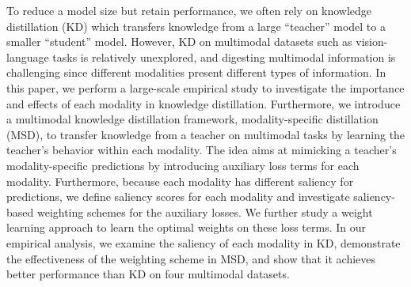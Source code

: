 To reduce a model size but retain performance, we often rely on knowledge distillation (KD) which transfers knowledge from a large ``teacher'' model to a smaller ``student'' model. However, KD on multimodal datasets such as vision-language tasks is relatively unexplored, and digesting multimodal information is challenging since different modalities present different types of information. In this paper, we perform a large-scale empirical study to investigate the importance and effects of each modality in knowledge distillation. Furthermore, we introduce a multimodal knowledge distillation framework, modality-specific distillation (MSD), to transfer knowledge from a teacher on multimodal tasks by learning the teacher's behavior within each modality. The idea aims at mimicking a teacher's modality-specific predictions by introducing auxiliary loss terms for each modality. Furthermore, because each modality has different saliency for predictions, we define saliency scores for each modality and investigate saliency-based weighting schemes for the auxiliary losses. We further study a weight learning approach to learn the optimal weights on these loss terms. In our empirical analysis, we examine the saliency of each modality in KD, demonstrate the effectiveness of the weighting scheme in MSD, and show that it achieves better performance than KD on four multimodal datasets.
